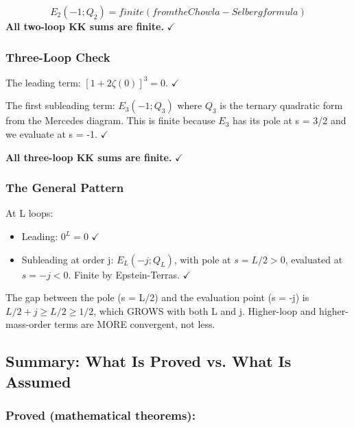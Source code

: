 \documentclass[aps,prd,preprint,superscriptaddress,longbibliography,floatfix]{revtex4-2}
\theoremstyle{remark}
\begin{document}
\begin{equation}
    E_{2}(-1; Q_{2}) = finite (from the Chowla-Selberg formula)
\end{equation}
\textbf{All two-loop KK sums are finite.} $\checkmark$


\subsubsection{Three-Loop Check}

The leading term: $[1 + 2\zeta(0)]^{3} = 0$. $\checkmark$

The first subleading term: $E_{3}(-1; Q_{3})$ where $Q_{3}$ is the ternary quadratic form from the Mercedes diagram. This is finite because $E_{3}$ has its pole at s = 3/2 and we evaluate at s = -1. $\checkmark$

\textbf{All three-loop KK sums are finite.} $\checkmark$


\subsubsection{The General Pattern}

At L loops:

\begin{itemize}
  \item Leading: $0^L = 0$ $\checkmark$
  \item Subleading at order j: $E_L(-j; Q_L)$, with pole at $s = L/2 > 0$, evaluated at $s = -j < 0$. Finite by Epstein-Terras. $\checkmark$
\end{itemize}

The gap between the pole (s = L/2) and the evaluation point (s = -j) is $L/2 + j \geq L/2 \geq 1/2$, which GROWS with both L and j. Higher-loop and higher-mass-order terms are MORE convergent, not less.



\subsection{Summary: What Is Proved vs. What Is Assumed}


\subsubsection{Proved (mathematical theorems):}
\end{document}
